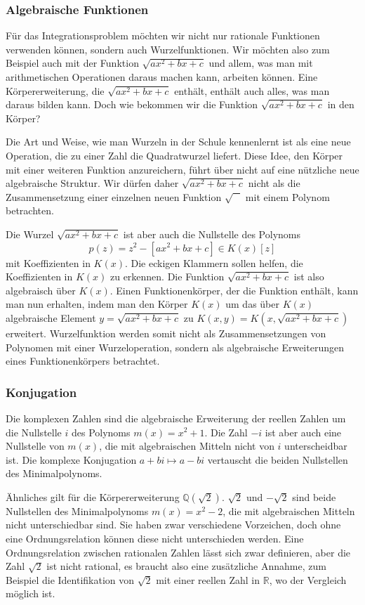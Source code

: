 %
%
\subsubsection{Algebraische Funktionen}
Für das Integrationsproblem möchten wir nicht nur rationale Funktionen
verwenden können, sondern auch Wurzelfunktionen.
Wir möchten also zum Beispiel auch mit der Funktion $\sqrt{ax^2+bx+c}$
und allem, was man mit arithmetischen Operationen daraus machen kann,
arbeiten können.
Eine Körpererweiterung, die $\sqrt{ax^2+bx+c}$ enthält, enthält auch
alles, was man daraus bilden kann.
Doch wie bekommen wir die Funktion $\sqrt{ax^2+bx+c}$ in den Körper?

Die Art und Weise, wie man Wurzeln in der Schule kennenlernt ist als
eine neue Operation, die zu einer Zahl die Quadratwurzel liefert.
Diese Idee, den Körper mit einer weiteren Funktion anzureichern,
führt über nicht auf eine nützliche neue algebraische Struktur.
Wir dürfen daher $\sqrt{ax^2+bx+c}$ nicht als die Zusammensetzung
einer einzelnen neuen Funktion $\sqrt{\phantom{A}}$ mit
einem Polynom betrachten.

Die Wurzel $\sqrt{ax^2+bx+c}$ ist aber auch die Nullstelle des Polynoms
\[
p(z)
=
z^2 - [ax^2+bx+c]
\in
K(x)[z]
\]
mit Koeffizienten in $K(x)$.
Die eckigen Klammern sollen helfen, die Koeffizienten in $K(x)$
zu erkennen.
Die Funktion $\sqrt{ax^2+bx+c}$ ist also algebraisch über $K(x)$.
Einen Funktionenkörper, der die Funktion enthält, kann man nun erhalten,
indem man den Körper $K(x)$ um das über $K(x)$ algebraische Element
$y=\sqrt{ax^2+bx+c}$ zu $K(x,y)=K(x,\sqrt{ax^2+bx+c})$ erweitert.
Wurzelfunktion werden somit nicht als Zusammensetzungen von Polynomen
mit einer Wurzeloperation, sondern als
algebraische Erweiterungen eines Funktionenkörpers betrachtet.

%
%
\subsubsection{Konjugation}
Die komplexen Zahlen sind die algebraische Erweiterung der reellen Zahlen
um die Nullstelle $i$ des Polynoms $m(x)=x^2+1$.
Die Zahl $-i$ ist aber auch eine Nullstelle von $m(x)$, die mit algebraischen
Mitteln nicht von $i$ unterscheidbar ist.
Die komplexe Konjugation $a+bi\mapsto a-bi$ vertauscht die beiden 
%
%
Nullstellen des Minimalpolynoms.

Ähnliches gilt für die Körpererweiterung $\mathbb{Q}(\!\sqrt{2})$.
$\sqrt{2}$ und $-\sqrt{2}$ sind beide Nullstellen des Minimalpolynoms
$m(x)=x^2-2$, die mit algebraischen Mitteln nicht unterschiedbar sind.
Sie haben zwar verschiedene Vorzeichen, doch ohne eine Ordnungsrelation
können diese nicht unterschieden werden.
%
Eine Ordnungsrelation zwischen rationalen Zahlen lässt sich zwar
definieren, aber die Zahl $\sqrt{2}$ ist nicht rational, es braucht
also eine zusätzliche Annahme, zum Beispiel die Identifikation von
$\sqrt{2}$ mit einer reellen Zahl in $\mathbb{R}$, wo der Vergleich
möglich ist.

